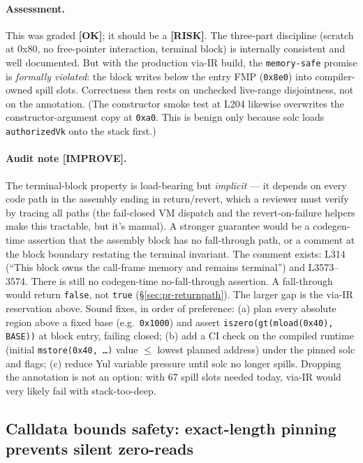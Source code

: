 \paragraph{Assessment.}  This was graded
\textcolor{tracegreen}{\textbf{[OK]}}; it should be a
\textcolor{rustorange}{\textbf{[RISK]}}. The three-part discipline
(scratch at 0x80, no free-pointer interaction, terminal block) is
internally consistent and well documented. But with the production
via-IR build, the \texttt{memory-safe} promise is \emph{formally
violated}: the block writes below the entry FMP (\texttt{0x8e0})
into compiler-owned spill slots. Correctness then rests on
unchecked live-range disjointness, not on the annotation.
(The constructor smoke test at L204 likewise overwrites the
constructor-argument copy at \texttt{0xa0}. This is benign only
because solc loads \texttt{authorizedVk} onto the stack first.)

\paragraph{Audit note [IMPROVE].} The terminal-block property is
load-bearing but \emph{implicit} --- it depends on every code path
in the assembly ending in return/revert, which a reviewer must
verify by tracing all paths (the fail-closed VM dispatch and the
revert-on-failure helpers make this tractable, but it's manual).
A stronger guarantee would be a codegen-time assertion that the
assembly block has no fall-through path, or a comment at the block
boundary restating the terminal invariant.  The
comment exists: L314 (``This block owns the call-frame memory and
remains terminal'') and L3573--3574. There is still no
codegen-time no-fall-through assertion. A fall-through would return
\texttt{false}, not \texttt{true}
(\S\ref{sec:pr-returnpath}).  The larger gap is the
via-IR reservation above. Sound fixes, in order of preference:
(a) plan every absolute region above a fixed base
(e.g.\ \texttt{0x1000}) and assert
\texttt{iszero(gt(mload(0x40), BASE))} at block entry, failing
closed; (b) add a CI check on the compiled runtime (initial
\texttt{mstore(0x40, \ldots)} value $\le$ lowest planned address)
under the pinned solc and flags; (c) reduce Yul variable pressure
until solc no longer spills. Dropping the annotation is not an
option: with 67 spill slots needed today, via-IR would very likely fail with stack-too-deep.

\subsection{Calldata bounds safety: exact-length pinning prevents silent zero-reads}
\label{sec:pr-calldatabounds}

